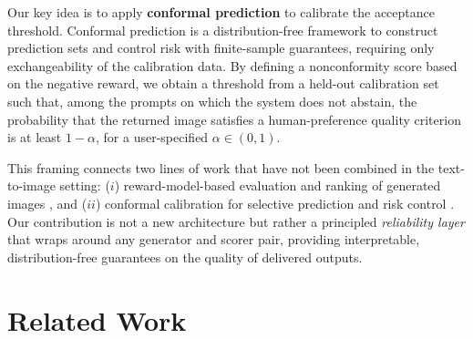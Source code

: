 \documentclass[twocolumn,11pt]{article}
\newcommand{\TODO}[1]{\textcolor{red}{\textbf{TODO:} #1}}
\theoremstyle{plain}
\theoremstyle{definition}
\theoremstyle{remark}
\begin{document}
Our key idea is to apply \textbf{conformal prediction} \citep{vovk2005algorithmic, angelopoulos2023conformal} to calibrate the acceptance threshold. Conformal prediction is a distribution-free framework to construct prediction sets and control risk with finite-sample guarantees, requiring only exchangeability of the calibration data. By defining a nonconformity score based on the negative reward, we obtain a threshold from a held-out calibration set such that, among the prompts on which the system does not abstain, the probability that the returned image satisfies a human-preference quality criterion is at least \(1-\alpha\), for a user-specified \(\alpha\in(0,1)\).

This framing connects two lines of work that have not been combined in the text-to-image setting: ($i$) reward-model-based evaluation and ranking of generated images \citep{xu2023imagereward, kirstain2023pick, wu2023human}, and ($ii$) conformal calibration for selective prediction and risk control \citep{angelopoulos2022conformal, geifman2017selective}. Our contribution is not a new  architecture but rather a principled \emph{reliability layer} that wraps around any generator and scorer pair, providing interpretable, distribution-free guarantees on the quality of delivered outputs.





\section{Related Work}
\end{document}
